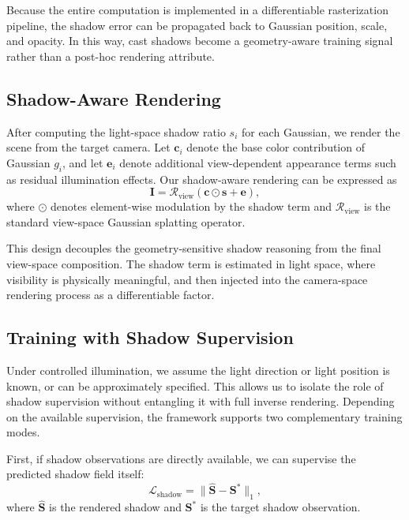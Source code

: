 Because the entire computation is implemented in a differentiable rasterization pipeline, the shadow error can be propagated back to Gaussian position, scale, and opacity. In this way, cast shadows become a geometry-aware training signal rather than a post-hoc rendering attribute.

\subsection{Shadow-Aware Rendering}
\label{sec:method_render}

After computing the light-space shadow ratio $s_i$ for each Gaussian, we render the scene from the target camera. Let $\mathbf{c}_i$ denote the base color contribution of Gaussian $g_i$, and let $\mathbf{e}_i$ denote additional view-dependent appearance terms such as residual illumination effects. Our shadow-aware rendering can be expressed as
\begin{equation}
\mathbf{I} = \mathcal{R}_{\text{view}}(\mathbf{c} \odot \mathbf{s} + \mathbf{e}),
\end{equation}
where $\odot$ denotes element-wise modulation by the shadow term and $\mathcal{R}_{\text{view}}$ is the standard view-space Gaussian splatting operator.

This design decouples the geometry-sensitive shadow reasoning from the final view-space composition. The shadow term is estimated in light space, where visibility is physically meaningful, and then injected into the camera-space rendering process as a differentiable factor.

\subsection{Training with Shadow Supervision}
\label{sec:method_training}

Under controlled illumination, we assume the light direction or light position is known, or can be approximately specified. This allows us to isolate the role of shadow supervision without entangling it with full inverse rendering. Depending on the available supervision, the framework supports two complementary training modes.

First, if shadow observations are directly available, we can supervise the predicted shadow field itself:
\begin{equation}
\mathcal{L}_{\text{shadow}} = \|\hat{\mathbf{S}} - \mathbf{S}^{\ast}\|_1,
\end{equation}
where $\hat{\mathbf{S}}$ is the rendered shadow and $\mathbf{S}^{\ast}$ is the target shadow observation.

